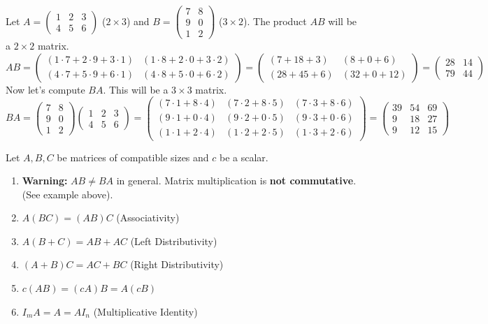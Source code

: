 \documentclass[oneside]{book}
\begin{document}
\begin{example}
Let $A = \begin{pmatrix} 1 & 2 & 3 \\ 4 & 5 & 6 \end{pmatrix}$ ($2 \times 3$) and $B = \begin{pmatrix} 7 & 8 \\ 9 & 0 \\ 1 & 2 \end{pmatrix}$ ($3 \times 2$).
The product $AB$ will be a $2 \times 2$ matrix.
\[
AB = \begin{pmatrix}
(1\cdot 7 + 2\cdot 9 + 3\cdot 1) & (1\cdot 8 + 2\cdot 0 + 3\cdot 2) \\
(4\cdot 7 + 5\cdot 9 + 6\cdot 1) & (4\cdot 8 + 5\cdot 0 + 6\cdot 2)
\end{pmatrix}
= \begin{pmatrix}
(7 + 18 + 3) & (8 + 0 + 6) \\
(28 + 45 + 6) & (32 + 0 + 12)
\end{pmatrix}
= \begin{pmatrix} 28 & 14 \\ 79 & 44 \end{pmatrix}
\]
Now let's compute $BA$. This will be a $3 \times 3$ matrix.
\[
BA = \begin{pmatrix} 7 & 8 \\ 9 & 0 \\ 1 & 2 \end{pmatrix} \begin{pmatrix} 1 & 2 & 3 \\ 4 & 5 & 6 \end{pmatrix}
= \begin{pmatrix}
(7\cdot 1 + 8\cdot 4) & (7\cdot 2 + 8\cdot 5) & (7\cdot 3 + 8\cdot 6) \\
(9\cdot 1 + 0\cdot 4) & (9\cdot 2 + 0\cdot 5) & (9\cdot 3 + 0\cdot 6) \\
(1\cdot 1 + 2\cdot 4) & (1\cdot 2 + 2\cdot 5) & (1\cdot 3 + 2\cdot 6)
\end{pmatrix}
= \begin{pmatrix} 39 & 54 & 69 \\ 9 & 18 & 27 \\ 9 & 12 & 15 \end{pmatrix}
\]
\end{example}

\begin{property}
Let $A, B, C$ be matrices of compatible sizes and $c$ be a scalar.
\begin{enumerate}
    \item \textbf{Warning:} $AB \neq BA$ in general. Matrix multiplication is \textbf{not commutative}. (See example above).
    \item $A(BC) = (AB)C$ (Associativity)
    \item $A(B+C) = AB + AC$ (Left Distributivity)
    \item $(A+B)C = AC + BC$ (Right Distributivity)
    \item $c(AB) = (cA)B = A(cB)$
    \item $I_m A = A = A I_n$ (Multiplicative Identity)
\end{enumerate}
\end{property}
\end{document}
